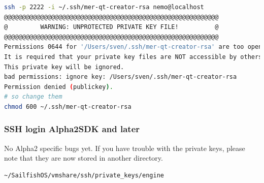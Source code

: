 \begin{lstlisting}[language=bash]
ssh -p 2222 -i ~/.ssh/mer-qt-creator-rsa nemo@localhost
@@@@@@@@@@@@@@@@@@@@@@@@@@@@@@@@@@@@@@@@@@@@@@@@@@@@@@@@@@@
@         WARNING: UNPROTECTED PRIVATE KEY FILE!          @
@@@@@@@@@@@@@@@@@@@@@@@@@@@@@@@@@@@@@@@@@@@@@@@@@@@@@@@@@@@
Permissions 0644 for '/Users/sven/.ssh/mer-qt-creator-rsa' are too open.
It is required that your private key files are NOT accessible by others.
This private key will be ignored.
bad permissions: ignore key: /Users/sven/.ssh/mer-qt-creator-rsa
Permission denied (publickey).
# so change them
chmod 600 ~/.ssh/mer-qt-creator-rsa
\end{lstlisting}
%
%
\subsubsection{SSH login Alpha2SDK and later}
%
No Alpha2 specific bugs yet. If you have trouble with the private keys, please note that they are now stored in another directory\cite{mer02}.
%
\begin{lstlisting}[language=bash]
~/SailfishOS/vmshare/ssh/private_keys/engine
\end{lstlisting}
%
%
